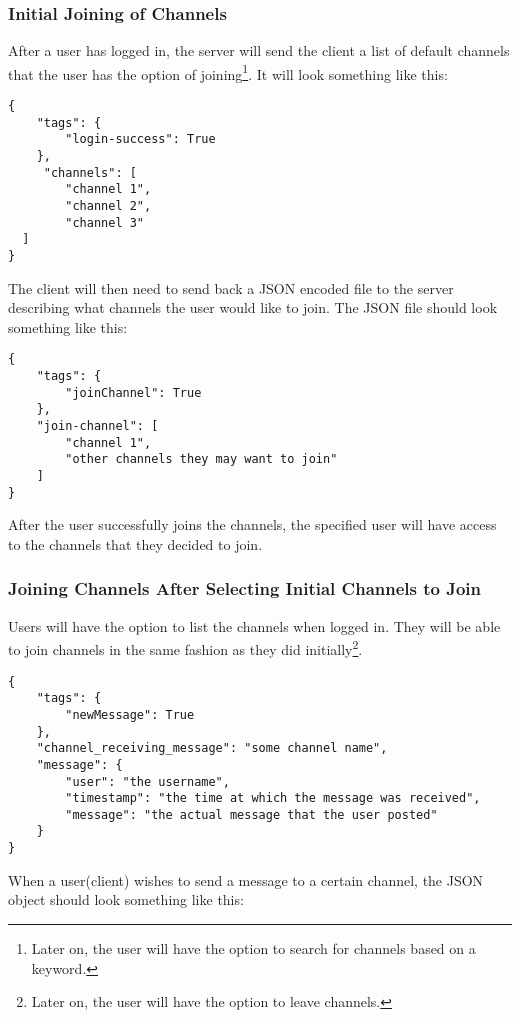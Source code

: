 \subsubsection{Initial Joining of Channels}
After a user has logged in, the server will send the client a list of default channels that the user has the option of joining\footnote{Later on, the user will have the option to search for channels based on a keyword.}. It will look something like this:

\begin{lstlisting}[style=json]
{
    "tags": {
        "login-success": True
    },
     "channels": [
        "channel 1",
        "channel 2",
        "channel 3"
  ]
}
\end{lstlisting}

The client will then need to send back a JSON encoded file to the server describing what channels the user would like to join. The JSON file should look something like this:

\begin{lstlisting}[style=json]
{
    "tags": {
        "joinChannel": True
    },
    "join-channel": [
        "channel 1",
        "other channels they may want to join"
    ]
}
\end{lstlisting}

After the user successfully joins the channels, the specified user will have
access to the channels that they decided to join.

\subsubsection{Joining Channels After Selecting Initial Channels to Join}
Users will have the option to list the channels when logged in. They will be
able to join channels in the same fashion as they did initially\footnote{Later on, the user will have the option to leave channels.}.

\begin{lstlisting}[style=json]
{
    "tags": {
        "newMessage": True
    },
    "channel_receiving_message": "some channel name",
    "message": {
        "user": "the username",
        "timestamp": "the time at which the message was received",
        "message": "the actual message that the user posted"
    }
}
\end{lstlisting}

When a user(client) wishes to send a message to a certain channel, the JSON object should look something like this:

